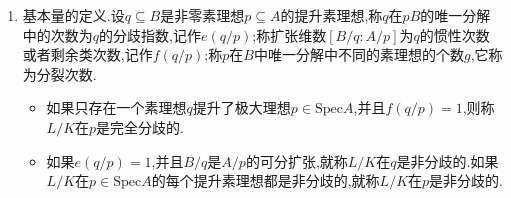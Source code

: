 \begin{enumerate}
\begin{enumerate}
	\end{enumerate}
	\item 基本量的定义.设$q\subseteq B$是非零素理想$p\subseteq A$的提升素理想,称$q$在$pB$的唯一分解中的次数为$q$的分歧指数,记作$e(q/p)$;称扩张维数$[B/q:A/p]$为$q$的惯性次数或者剩余类次数,记作$f(q/p)$;称$p$在$B$中唯一分解中不同的素理想的个数$g$,它称为分裂次数.
	\begin{itemize}
		\item 如果只存在一个素理想$q$提升了极大理想$p\in\mathrm{Spec}A$,并且$f(q/p)=1$,则称$L/K$在$p$是完全分歧的.
		\item 如果$e(q/p)=1$,并且$B/q$是$A/p$的可分扩张,就称$L/K$在$q$是非分歧的.如果$L/K$在$p\in\mathrm{Spec}A$的每个提升素理想都是非分歧的,就称$L/K$在$p$是非分歧的.
	\end{itemize}
\end{enumerate}

